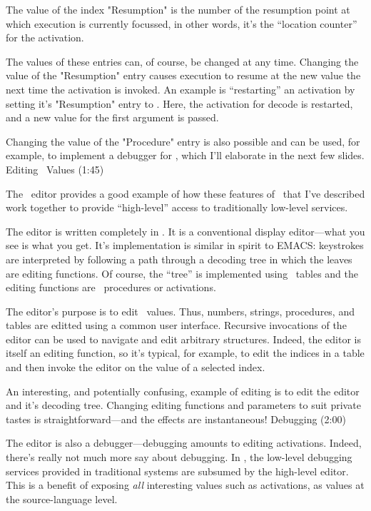 The value of the index {\pt "Resumption"} is the number of the
resumption point at which execution is currently focussed,
in other words, it's the ``location counter'' for the activation.

The values of these entries can, of course, be changed at any time.
Changing the value of the {\pt "Resumption"} entry causes
execution to resume at the new value the next time the activation
is invoked.
An example is ``restarting'' an activation by setting
it's {\pt "Resumption"} entry to {}.
Here, the activation for {\pt decode} is restarted,
and a new value for the first argument is passed.

Changing the value of the {\pt "Procedure"} entry is also possible
and can be used, for example, to implement a debugger for \EZ,
which I'll elaborate in the next few slides.
\NewPage
\beginsection Editing \EZ\ Values (1:45)

The \EZ\ editor provides a good example of how these features
of \EZ\ that I've described work together to provide
``high-level'' access to traditionally low-level services.

The editor is written completely in \EZ.
It is a conventional display editor---what you see is what you get.
It's implementation is similar in spirit to EMACS:
keystrokes are interpreted by following a path
through a decoding tree in which the leaves
are editing functions.
Of course, the ``tree'' is implemented using \EZ\ tables
and the editing functions are \EZ\ procedures or activations.

The editor's purpose is to edit \EZ\ values.
Thus, numbers, strings, procedures, and tables are
editted using a common user interface.
Recursive invocations of the editor can be used
to navigate and edit arbitrary structures.
Indeed, the editor is itself an editing function,
so it's typical, for example, to edit the indices in
a table and then invoke the editor on the value of a selected index.

An interesting, and potentially confusing, example of editing
is to edit the editor and it's decoding tree.
Changing editing functions and parameters to suit private
tastes is straightforward---and the effects are instantaneous!
\NewPage
\beginsection Debugging (2:00)

The editor is also a debugger---debugging amounts to editing activations.
Indeed, there's really not much more say about debugging.
In \EZ, the low-level debugging services provided in traditional
systems are subsumed by the high-level editor.
This is a benefit of exposing {\sl all\/} interesting values
such as activations, as values at the source-language level.

